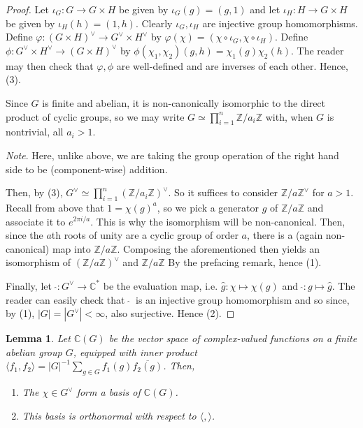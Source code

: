 \documentclass[12pt]{article}
\newcommand{\ints}{\mathbb{Z}}
\newcommand{\complex}{\mathbb{C}}
\newcommand{\iprod}[2]{\langle #1, #2 \rangle}
\newcommand{\intsmod}[1]{\ints / #1 \ints}
\newtheorem{lemma}{Lemma}
\numberwithin{equation}{section}
\numberwithin{thm}{section}
\numberwithin{lemma}{section}
\begin{document}
\begin{proof}
  Let $\iota_G: G \to G \times H$ be given by $\iota_G(g) = (g, 1)$ and let $\iota_H: H \to G \times H$ be given by $\iota_H (h) = (1, h)$. Clearly $\iota_G, \iota_H$ are injective group homomorphisms. Define $\varphi: (G \times H)^{\vee} \to G^{\vee} \times H^{\vee}$ by $\varphi (\chi) = (\chi \circ \iota_G , \chi \circ \iota_H)$. Define $\phi: G^{\vee} \times H^{\vee} \to (G \times H)^{\vee}$ by $\phi(\chi_1, \chi_2)(g, h) = \chi_1(g)\chi_2(h)$. The reader may then check that $\varphi, \phi$ are well-defined and are inverses of each other. Hence, (3).

  Since $G$ is finite and abelian, it is non-canonically isomorphic to the direct product of cyclic groups, so we may write $G \simeq \prod_{i = 1}^{n} \intsmod{a_i}$ with, when $G$ is nontrivial, all $a_i > 1$. 
  
  \textit{Note}. Here, unlike above, we are taking the group operation of the right hand side to be (component-wise) addition.
  
  Then, by (3), $G^{\vee} \simeq \prod_{i = 1}^n (\intsmod{a_i})^{\vee}$. So it suffices to consider $\intsmod{a}^{\vee}$ for $a > 1$. Recall from above that $1 = \chi(g)^a$, so we pick a generator $g$ of $\intsmod{a}$ and associate it to $e^{2 \pi i / a}$. This is why the isomorphism will be non-canonical. Then, since the $a$th roots of unity are a cyclic group of order $a$, there is a (again non-canonical) map into $\intsmod{a}$. Composing the aforementioned then yields an isomorphism of $(\intsmod{a})^{\vee}$ and $\intsmod{a}$ By the prefacing remark, hence (1).

  Finally, let $\ \widehat{} : G^{\vee} \to \complex^*$ be the evaluation map, i.e. $\widehat{g} : \chi \mapsto \chi(g)$ and $\ \widehat{} : g \mapsto \widehat{g}$. The reader can easily check that $\ \widehat{} \ $ is an injective group homomorphism and so since, by (1), $|G| = |G^{\vee}| < \infty$, also surjective. Hence (2).
\end{proof}

\begin{lemma}\label{DualIsOrthonormalBasis}
  Let $\complex(G)$ be the vector space of complex-valued functions on a finite abelian group $G$, equipped with inner product $\iprod{f_1}{f_2} = |G|^{-1} \sum_{g \in G} f_1(g) \overline{f_2(g)}$. Then,
  \begin{enumerate}
    \item The $\chi \in G^{\vee}$ form a basis of $\complex(G)$.
    \item This basis is orthonormal with respect to $\iprod{}{}$.
  \end{enumerate}
\end{lemma}
\end{document}
